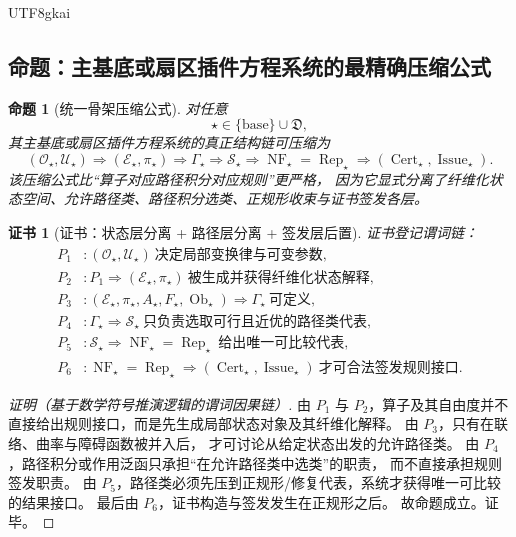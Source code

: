 \documentclass[12pt]{article}
\newtheorem{proposition}{命题}[section]
\newtheorem{Certificate}{证书}[section]
\newcommand{\Ob}{\operatorname{Ob}}
\newcommand{\Cert}{\operatorname{Cert}}
\newcommand{\Issue}{\operatorname{Issue}}
\begin{document}
\begin{CJK*}{UTF8}{gkai}
\subsection{命题：主基底或扇区插件方程系统的最精确压缩公式}
\label{subsec:tex37-ch12-prop}

\begin{proposition}[统一骨架压缩公式]
\label{prop:tex37-ch12-chain}
对任意
\[
  \star\in \{\mathrm{base}\}\cup\mathfrak D,
\]
其主基底或扇区插件方程系统的真正结构链可压缩为
\[
  \boxed{
    (\mathcal O_\star,\mathcal U_\star)
    \Longrightarrow
    (\mathcal E_\star,\pi_\star)
    \Longrightarrow
    \Gamma_\star
    \Longrightarrow
    \mathcal S_\star
    \Longrightarrow
    \operatorname{NF}_\star=\operatorname{Rep}_\star
    \Longrightarrow
    (\Cert_\star,\Issue_\star).
  }
\]
该压缩公式比“算子对应路径积分对应规则”更严格，
因为它显式分离了纤维化状态空间、允许路径类、路径积分选类、正规形收束与证书签发各层。
\end{proposition}

\begin{Certificate}[证书：状态层分离 + 路径层分离 + 签发层后置]
\label{cert:tex37-ch12-chain}
证书登记谓词链：
\[
\begin{aligned}
  P_1 &: (\mathcal O_\star,\mathcal U_\star)\ \text{决定局部变换律与可变参数},\\
  P_2 &: P_1\Rightarrow (\mathcal E_\star,\pi_\star)\ \text{被生成并获得纤维化状态解释},\\
  P_3 &: (\mathcal E_\star,\pi_\star,A_\star,F_\star,\Ob_\star)\Rightarrow \Gamma_\star\ \text{可定义},\\
  P_4 &: \Gamma_\star\Rightarrow \mathcal S_\star\ \text{只负责选取可行且近优的路径类代表},\\
  P_5 &: \mathcal S_\star\Rightarrow \operatorname{NF}_\star=\operatorname{Rep}_\star\ \text{给出唯一可比较代表},\\
  P_6 &: \operatorname{NF}_\star=\operatorname{Rep}_\star\Rightarrow (\Cert_\star,\Issue_\star)\ \text{才可合法签发规则接口}.
\end{aligned}
\]
\end{Certificate}

\begin{proof}[证明（基于数学符号推演逻辑的谓词因果链）]
由 $P_1$ 与 $P_2$，算子及其自由度并不直接给出规则接口，而是先生成局部状态对象及其纤维化解释。
由 $P_3$，只有在联络、曲率与障碍函数被并入后，
才可讨论从给定状态出发的允许路径类。
由 $P_4$，路径积分或作用泛函只承担“在允许路径类中选类”的职责，
而不直接承担规则签发职责。
由 $P_5$，路径类必须先压到正规形/修复代表，系统才获得唯一可比较的结果接口。
最后由 $P_6$，证书构造与签发发生在正规形之后。
故命题成立。证毕。
\end{proof}


\end{CJK*}
\end{document}
